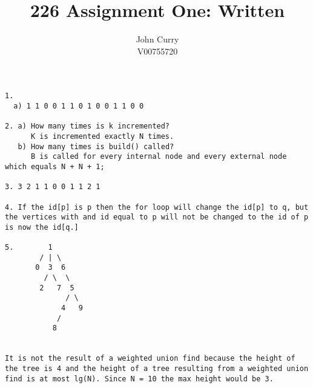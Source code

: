 \documentclass{article}
\title{226 Assignment One: Written}
\author{John Curry\\
        V00755720}
\begin{document}
\maketitle
\begin{verbatim}
1.
  a) 1 1 0 0 1 1 0 1 0 0 1 1 0 0

2. a) How many times is k incremented?
      K is incremented exactly N times.
   b) How many times is build() called?
      B is called for every internal node and every external node which equals N + N + 1;

3. 3 2 1 1 0 0 1 1 2 1

4. If the id[p] is p then the for loop will change the id[p] to q, but the vertices with and id equal to p will not be changed to the id of p is now the id[q.]

5.        1
        / | \
       0  3  6
         / \  \
        2   7  5
              / \
             4   9
            /
           8


It is not the result of a weighted union find because the height of the tree is 4 and the height of a tree resulting from a weighted union find is at most lg(N). Since N = 10 the max height would be 3.
\end{verbatim}
\end{document}
